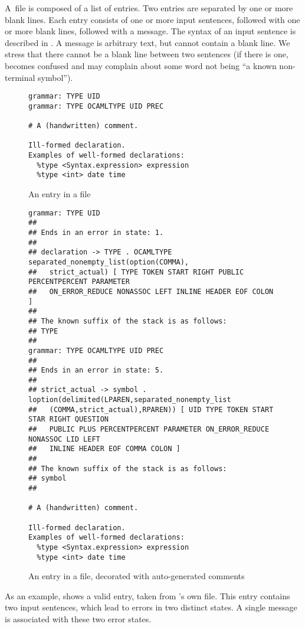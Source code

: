 \documentclass[onecolumn,11pt,nocopyrightspace,preprint]{sigplanconf}
\begin{document}
A~\messages file is composed of a list of entries. Two entries are separated
by one or more blank lines. Each entry consists of one or more input
sentences, followed with one or more blank lines, followed with a message. The
syntax of an input sentence is described in . A message is
arbitrary text, but cannot contain a blank line. We stress that there cannot
be a blank line between two sentences (if there is one, \menhir becomes confused
and may complain about some word not being ``a known non-terminal symbol'').

\begin{figure}
\begin{verbatim}
grammar: TYPE UID
grammar: TYPE OCAMLTYPE UID PREC

# A (handwritten) comment.

Ill-formed declaration.
Examples of well-formed declarations:
  %type <Syntax.expression> expression
  %type <int> date time
\end{verbatim}
\caption{An entry in a \messages file}
\label{fig:messages:entry}
\end{figure}

\begin{figure}
\begin{verbatim}
grammar: TYPE UID
##
## Ends in an error in state: 1.
##
## declaration -> TYPE . OCAMLTYPE separated_nonempty_list(option(COMMA),
##   strict_actual) [ TYPE TOKEN START RIGHT PUBLIC PERCENTPERCENT PARAMETER
##   ON_ERROR_REDUCE NONASSOC LEFT INLINE HEADER EOF COLON ]
##
## The known suffix of the stack is as follows:
## TYPE
##
grammar: TYPE OCAMLTYPE UID PREC
##
## Ends in an error in state: 5.
##
## strict_actual -> symbol . loption(delimited(LPAREN,separated_nonempty_list
##   (COMMA,strict_actual),RPAREN)) [ UID TYPE TOKEN START STAR RIGHT QUESTION
##   PUBLIC PLUS PERCENTPERCENT PARAMETER ON_ERROR_REDUCE NONASSOC LID LEFT
##   INLINE HEADER EOF COMMA COLON ]
##
## The known suffix of the stack is as follows:
## symbol
##

# A (handwritten) comment.

Ill-formed declaration.
Examples of well-formed declarations:
  %type <Syntax.expression> expression
  %type <int> date time
\end{verbatim}
\caption{An entry in a \messages file, decorated with auto-generated comments}
\label{fig:messages:entry:decorated}
\end{figure}

As an example,  shows a valid entry, taken
from \menhir's own \messages file. This entry contains two input sentences,
which lead to errors in two distinct states. A single message is associated
with these two error states.
\end{document}
